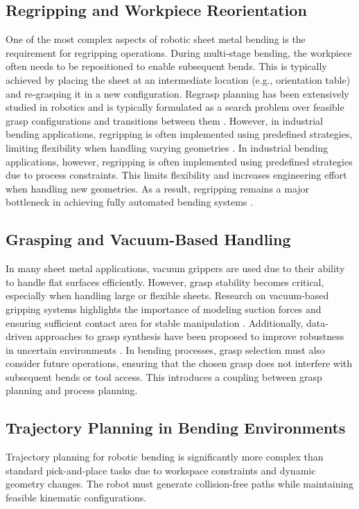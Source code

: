 \subsection{Regripping and Workpiece Reorientation}
One of the most complex aspects of robotic sheet metal bending is the requirement for regripping operations. During multi-stage bending, the workpiece often needs to be repositioned to enable subsequent bends. This is typically achieved by placing the sheet at an intermediate location (e.g., orientation table) and re-grasping it in a new configuration.
Regrasp planning has been extensively studied in robotics and is typically formulated as a search problem over feasible grasp configurations and transitions between them \cite{wan2017regrasp}. However, in industrial bending applications, regripping is often implemented using predefined strategies, limiting flexibility when handling varying geometries \cite{Gupta1998SheetMetalBending}. 
In industrial bending applications, however, regripping is often implemented using predefined strategies due to process constraints. This limits flexibility and increases engineering effort when handling new geometries. As a result, regripping remains a major bottleneck in achieving fully automated bending systems \cite{Aomura2002RoboticBending,Gupta1998SheetMetalBending}.
\subsection{Grasping and Vacuum-Based Handling}
In many sheet metal applications, vacuum grippers are used due to their ability to handle flat surfaces efficiently. However, grasp stability becomes critical, especially when handling large or flexible sheets.
Research on vacuum-based gripping systems highlights the importance of modeling suction forces and ensuring sufficient contact area for stable manipulation \cite{VacuumGripperModeling}. Additionally, data-driven approaches to grasp synthesis have been proposed to improve robustness in uncertain environments \cite{Bogue2018}.
In bending processes, grasp selection must also consider future operations, ensuring that the chosen grasp does not interfere with subsequent bends or tool access. This introduces a coupling between grasp planning and process planning.
\subsection{Trajectory Planning in Bending Environments}
Trajectory planning for robotic bending is significantly more complex than standard pick-and-place tasks due to workspace constraints and dynamic geometry changes. The robot must generate collision-free paths while maintaining feasible kinematic configurations.
 
